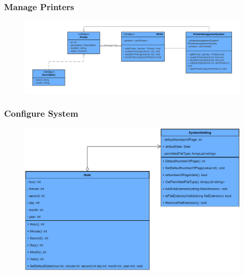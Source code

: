     \newpage
    \subsubsection{Manage Printers}
    \begin{center}
    \begin{figure}[!htp]
    \begin{center}
     \includegraphics[scale=.5]{images/Task2/ClassDiagrams/ManagingPrinters.pdf}
    \end{center}
    \label{refhinh1}
    \end{figure}
    \end{center}


    \subsubsection{Configure System}
    \begin{center}
    \begin{figure}[!htp]
    \begin{center}
     \includegraphics[scale=.2]{images/Task2/ClassDiagrams/ConfigureSystemClassDiagram.drawio (1).png}
    \end{center}
    \label{refhinh1}
    \end{figure}
    \end{center}


